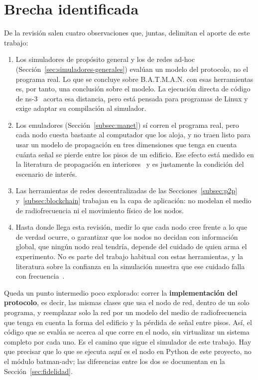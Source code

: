 \section{Brecha identificada}
\label{sec:brecha}

De la revisión salen cuatro observaciones que, juntas, delimitan el aporte de este
trabajo:

\begin{enumerate}
\item Los simuladores de propósito general y los de redes ad-hoc
(Sección~\ref{sec:simuladores-generales}) evalúan un modelo del protocolo, no el
programa real. Lo que se concluye sobre B.A.T.M.A.N. con esas herramientas es, por
tanto, una conclusión sobre el modelo. La ejecución directa de código de
ns-3~\cite{Tazaki2013DCE} acorta esa distancia, pero está pensada para programas de
Linux y exige adaptar su compilación al simulador.

\item Los emuladores (Sección~\ref{subsec:manet}) sí corren el programa real, pero
cada nodo cuesta bastante al computador que los aloja, y no traen listo para usar un
modelo de propagación en tres dimensiones que tenga en cuenta cuánta señal se pierde
entre los pisos de un edificio. Ese efecto está medido en la literatura de
propagación en interiores~\cite{Seidel1992Multifloor} y es justamente la condición
del escenario de interés.

\item Las herramientas de redes descentralizadas de las
Secciones~\ref{subsec:p2p} y~\ref{subsec:blockchain} trabajan en la capa de
aplicación: no modelan el medio de radiofrecuencia ni el movimiento físico de los
nodos.

\item Hasta donde llega esta revisión, medir lo que cada nodo cree frente a lo que
de verdad ocurre, o garantizar que los nodos no decidan con información global, que
ningún nodo real tendría, depende del cuidado de quien arma el experimento. No es
parte del trabajo habitual con estas herramientas, y la literatura sobre la
confianza en la simulación muestra que ese cuidado falla con
frecuencia~\cite{Kurkowski2005Incredibles}.
\end{enumerate}

Queda un punto intermedio poco explorado: correr la \textbf{implementación del
protocolo}, es decir, las mismas clases que usa el nodo de red, dentro de un solo
programa, y reemplazar solo la red por un modelo del medio de radiofrecuencia que
tenga en cuenta la forma del edificio y la pérdida de señal entre pisos. Así, el
código que se evalúa se acerca al que corre en el nodo, sin virtualizar un sistema
completo por cada uno. Es el camino que sigue el simulador de este trabajo. Hay que
precisar que lo que se ejecuta aquí es el nodo en Python de este proyecto, no el
módulo batman-adv; las diferencias entre los dos se documentan en la
Sección~\ref{sec:fidelidad}.
